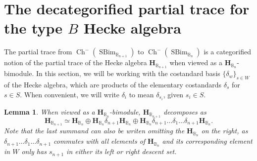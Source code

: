 \documentclass[11pt]{article}
\DeclareMathOperator{\Ch}{Ch}
\DeclareMathOperator{\SBim}{SBim}
\newtheorem{lemma}[thm]{Lemma}
\theoremstyle{definition}
\theoremstyle{remark}
\numberwithin{equation}{section}
\begin{document}
\section{The decategorified partial trace for the type $B$ Hecke algebra}
The partial trace from $\Ch^-(\SBim_{\mathbb{B}_{n+1}})$ to $\Ch^-(\SBim_{\mathbb{B}_{n}})$ is a
categorified notion of the partial trace of the Hecke algebra
$\mathbf{H}_{\mathbb{B}_{n+1}}$ when viewed as a $\mathbf{H}_{\mathbb{B}_n}$-bimodule. In this
section, we will be working with the costandard basis $\{\delta_w\}_{s\in W}$
of the Hecke algebra, which are products of the elementary costandards
$\delta_s$ for $s\in S$. When convenient, we will write $\delta_{i}$ to mean
$\delta_{s_i}$, given $s_i\in S$.
\begin{lemma}
	\label{lem:algebradecomposition}
	When viewed as a $\mathbf{H}_{\mathbb{B}_n}$-bimodule, $\mathbf{H}_{\mathbb{B}_{n+1}}$
	decomposes as
	\[\mathbf{H}_{\mathbb{B}_{n+1}}\simeq
		\mathbf{H}_{\mathbb{B}_n}\oplus \mathbf{H}_{\mathbb{B}_n}\delta_{n+1}\mathbf{H}_{\mathbb{B}_n}
		\oplus \mathbf{H}_{\mathbb{B}_n}\delta_{n+1}\dots \delta_1\dots \delta_{n+1}
	\mathbf{H}_{\mathbb{B}_{n}}.\]
Note that the last summand can also be writen omitting the
$\mathbf{H}_{\mathbb{B}_{n}}$ on the right, as $\delta_{n+1}\dots \delta_1\dots \delta_{n+1}$
commutes with all elements of $\mathbf{H}_{\mathbb{B}_{n}}$ and its corresponding
element in $W$ only has $s_{n+1}$ in either its left or right descent set.
\end{lemma}
\end{document}
